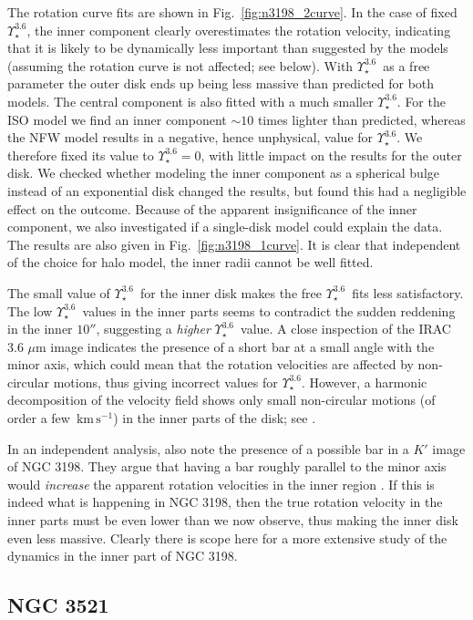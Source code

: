 \documentclass[usenatbib,usegraphicx,apjfonts,floatfix]{emulateapj}
\newcommand{\kms}{\ensuremath{\,\mbox{km}\,\mbox{s}^{-1}}}
\newcommand{\Ups}{\ensuremath{\Upsilon_{\star}^{3.6}}}
\begin{document}
The rotation curve fits are shown in Fig.~\ref{fig:n3198_2curve}. In
the case of fixed \Ups, the inner component clearly overestimates the
rotation velocity, indicating that it is likely to be dynamically less
important than suggested by the models (assuming the rotation curve is
not affected; see below).  With \Ups\ as a free parameter the outer
disk ends up being less massive than predicted for both models. The
central component is also fitted with a much smaller \Ups. For the ISO
model we find an inner component $\sim 10$ times lighter than
predicted, whereas the NFW model results in a negative, hence
unphysical, value for $\Ups$. We therefore fixed its value to $\Ups =
0$, with little impact on the results for the outer disk. We checked
whether modeling the inner component as a spherical bulge instead of
an exponential disk changed the results, but found this had a
negligible effect on the outcome.  Because of the apparent
insignificance of the inner component, we also investigated if a
single-disk model could explain the data.  The results are also given
in Fig.~\ref{fig:n3198_1curve}. It is clear that independent of the
choice for halo model, the inner radii cannot be well fitted.

The small value of \Ups\ for the inner disk makes the free \Ups\ fits
less satisfactory.  The low \Ups\ values in the inner parts seems to
contradict the sudden reddening in the inner $10''$, suggesting a
\emph{higher} \Ups\ value. A close inspection of the IRAC 3.6 $\mu$m image
indicates the presence of a short bar at a small angle with the minor
axis, which could mean that the rotation velocities are affected by
non-circular motions, thus giving incorrect values for \Ups.  However,
a harmonic decomposition of the velocity field shows only small
non-circular motions (of order a few \kms) in the inner parts of the
disk; see \citet{clemens2007}.

In an independent analysis, \citet{bottema} also note the presence of
a possible bar in a $K'$ image of NGC 3198.  They argue that having a
bar roughly parallel to the minor axis would \emph{increase} the
apparent rotation velocities in the inner region \citep{teuben}. If
this is indeed what is happening in NGC 3198, then the true rotation
velocity in the inner parts must be even lower than we now observe,
thus making the inner disk even less massive. Clearly there is scope
here for a more extensive study of the dynamics in the inner part of
NGC 3198.

\subsection{NGC 3521}
\end{document}
